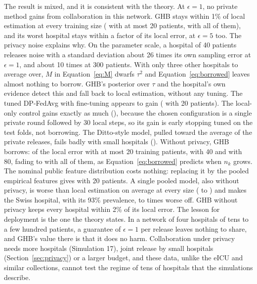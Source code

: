 The result is mixed, and it is consistent with the theory. At $\epsilon=1$, no private method gains from collaboration in this network. GHB stays within 1\% of local estimation at every training size (\SimRealHeartTwentyGHBRel{} with at most 20 patients, \SimRealHeartAllGHBRel{} with all of them), and its worst hospital stays within a factor \SimRealHeartGHBWorstMax{} of its local error, at $\epsilon=5$ too. The privacy noise explains why. On the parameter scale, a hospital of 40 patients releases noise with a standard deviation about 26 times its own sampling error at $\epsilon=1$, and about 10 times at 300 patients. With only three other hospitals to average over, $M$ in Equation~\eqref{eq:M} dwarfs $\tau^2$ and Equation~\eqref{eq:borrowed} leaves almost nothing to borrow. GHB's posterior over $\tau$ and the hospital's own evidence detect this and fall back to local estimation, without any tuning. The tuned DP-FedAvg with fine-tuning appears to gain (\SimRealHeartTwentyFTRel{} with 20 patients). The local-only control gains exactly as much (\SimRealHeartTwentyLGDRel), because the chosen configuration is a single private round followed by 30 local steps, so its gain is early stopping tuned on the test folds, not borrowing. The Ditto-style model, pulled toward the average of the private releases, fails badly with small hospitals (\SimRealHeartTwentyDittoRel). Without privacy, GHB borrows: \SimRealHeartTwentyGHBNoDPRel{} of the local error with at most 20 training patients, \SimRealHeartFortyGHBNoDPRel{} with 40 and \SimRealHeartEightyGHBNoDPRel{} with 80, fading to \SimRealHeartAllGHBNoDPRel{} with all of them, as Equation~\eqref{eq:borrowed} predicts when $n_k$ grows. The nominal public feature distribution costs nothing: replacing it by the pooled empirical features gives \SimRealHeartTwentyGHBEmpRel{} with 20 patients. A single pooled model, also without privacy, is worse than local estimation on average at every size (\SimRealHeartTwentyGlobalRel{} to \SimRealHeartAllGlobalRel) and makes the Swiss hospital, with its 93\% prevalence, \SimRealHeartGlobalWorstMin{} to \SimRealHeartGlobalWorstMax{} times worse off. GHB without privacy keeps every hospital within 2\% of its local error. The lesson for deployment is the one the theory states. In a network of four hospitals of tens to a few hundred patients, a guarantee of $\epsilon=1$ per release leaves nothing to share, and GHB's value there is that it does no harm. Collaboration under privacy needs more hospitals (Simulation 17), joint release by small hospitals (Section~\ref{sec:privacy}) or a larger budget, and these data, unlike the eICU and similar collections, cannot test the regime of tens of hospitals that the simulations describe.

